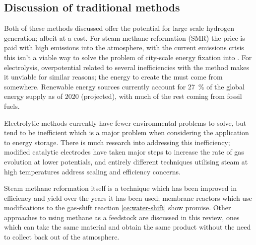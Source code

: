 \subsection{Discussion of traditional methods}%
\label{sub:discussion_of_traditional_methods}
Both of these methods discussed offer the potential for large scale hydrogen generation; albeit at a cost.
For steam methane reformation (SMR) the price is paid with high emissions into the atmosphere, with the current  emissions crisis this isn't a viable way to solve the problem of city-scale energy fixation into .
For electrolysis, overpotential related to several inefficiencies with the method makes it unviable for similar reasons; the energy to create the  must come from somewhere.
Renewable energy sources currently account for \SI{27}{\percent} of the global energy supply as of 2020\cite{IEA2020} (projected), with much of the rest coming from fossil fuels.

Electrolytic methods currently have fewer environmental problems to solve, but tend to be inefficient which is a major problem when considering the application to energy storage.
There is much research into addressing this inefficiency; modified catalytic electrodes have taken major steps to increase the rate of gas evolution at lower potentials, and entirely different techniques utilising steam at high temperatures address scaling and efficiency concerns.

Steam methane reformation itself is a technique which has been improved in efficiency and yield over the years it has been used; membrane reactors which use modifications to the gas-shift reaction \eqref{ce:water-shift}\cite{Saxena2011} show promise.
Other approaches to using methane as a feedstock are discussed in this review, ones which can take the same material and obtain the same product without the need to collect  back out of the atmosphere.

